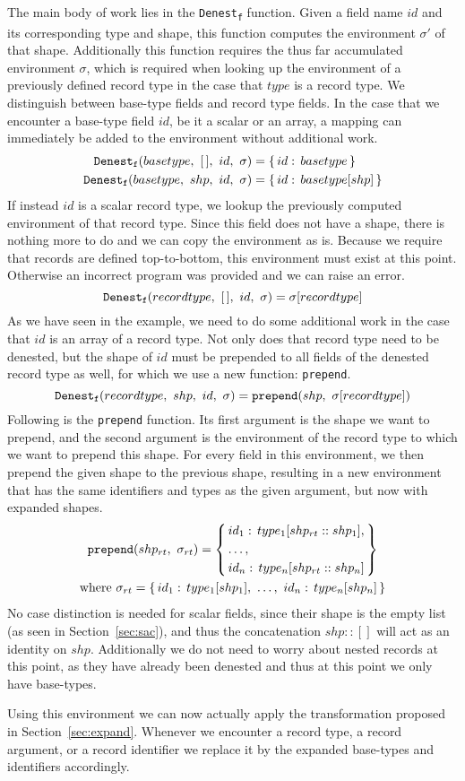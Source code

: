 The main body of work lies in the \texttt{Denest\textsubscript{f}} function.
Given a field name $id$ and its corresponding type and shape, this function computes the environment $\sigma'$ of that shape.
Additionally this function requires the thus far accumulated environment $\sigma$, which is required when looking up the environment of a previously defined record type in the case that $type$ is a record type.
We distinguish between base-type fields and record type fields.
In the case that we encounter a base-type field $id$, be it a scalar or an array, a mapping can immediately be added to the environment without additional work.
%
\begin{align*}
    \texttt{Denest\textsubscript{f}}(basetype,\ [\,],\ id,\ \sigma)
        &= \{\, id:\,basetype \,\} \\
    \texttt{Denest\textsubscript{f}}(basetype,\ shp,\ id,\ \sigma)
        &= \{\, id:\,basetype[shp] \,\}
\end{align*}
%
If instead $id$ is a scalar record type, we lookup the previously computed environment of that record type.
Since this field does not have a shape, there is nothing more to do and we can copy the environment as is.
Because we require that records are defined top-to-bottom, this environment must exist at this point.
Otherwise an incorrect program was provided and we can raise an error.
%
\[
    \texttt{Denest\textsubscript{f}}(recordtype,\ [\,],\ id,\ \sigma)
        = \sigma[recordtype]
\]
%
As we have seen in the example, we need to do some additional work in the case that $id$ is an array of a record type.
Not only does that record type need to be denested, but the shape of $id$ must be prepended to all fields of the denested record type as well, for which we use a new function: \texttt{prepend}.
%
\[
    \texttt{Denest\textsubscript{f}}(recordtype,\ shp,\ id,\ \sigma)
        = \texttt{prepend}(shp,\ \sigma[recordtype])
\]
%
Following is the \texttt{prepend} function.
Its first argument is the shape we want to prepend, and the second argument is the environment of the record type to which we want to prepend this shape.
For every field in this environment, we then prepend the given shape to the previous shape, resulting in a new environment that has the same identifiers and types as the given argument, but now with expanded shapes.
%
\begin{gather*}
    \texttt{prepend}(shp_{rt},\ \sigma_{rt})
    = \left\{\, \vcenter{
        \hbox{\ensuremath{id_1:\,type_1[shp_{rt} :: shp_1],}}
        \hbox{\ensuremath{\dots,}}
        \hbox{\ensuremath{id_n:\,type_n[shp_{rt} :: shp_n]}}
    } \,\right\}\\
    \text{where}\ \sigma_{rt} = \{\, id_1:\,type_1[shp_1],\ \dots,\ id_n:\,type_n[shp_n] \,\}
\end{gather*}
%
No case distinction is needed for scalar fields, since their shape is the empty list (as seen in Section~\ref{sec:sac}), and thus the concatenation $shp :: []$ will act as an identity on $shp$.
Additionally we do not need to worry about nested records at this point, as they have already been denested and thus at this point we only have base-types.

Using this environment we can now actually apply the transformation proposed in Section~\ref{sec:expand}.
Whenever we encounter a record type, a record argument, or a record identifier we replace it by the expanded base-types and identifiers accordingly.
